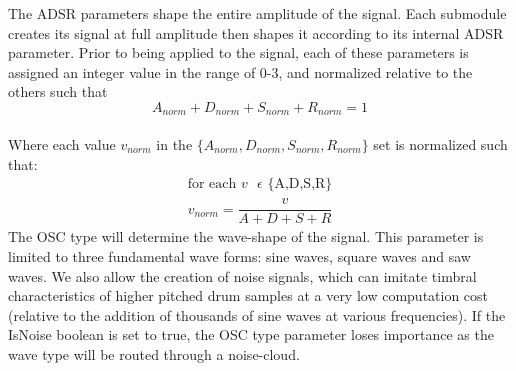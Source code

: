\documentclass[\main/thesis.tex]{subfiles}
\begin{document}
\begin{table}[t!]
\centering
{}
\caption{Synthesizer submodule Parameters. Despite the simplicity of the parameters and efforts at constraining the ranges, the number of parameters that can be randomly chosen for each submodule is in the order of $10^{15}$ }
\label{table:submodule_params}
\end{table}
The ADSR parameters shape the entire amplitude of the signal. Each submodule creates its signal at full amplitude then shapes it according to its internal ADSR parameter. Prior to being applied to the signal, each of these parameters is assigned an integer value in the range of 0-3, and normalized relative to the others such that \[ A_{norm} + D_{norm} + S_{norm} + R_{norm} = 1 \] \\ 
Where each value $v_{norm}$ in the $\{A_{norm}, D_{norm},S_{norm},R_{norm}\} $ set is normalized such that:
\begin{align*}
\text{for each $v$ $\epsilon$ \{A,D,S,R\}} \\
v_{norm} = \dfrac{v}{A + D + S + R}
\end{align*}
 The OSC type will determine the wave-shape of the signal. This parameter is limited to three fundamental wave forms: sine waves, square waves and saw waves. We also allow the creation of noise signals, which can imitate timbral characteristics of higher pitched drum samples at a very low computation cost (relative to the addition of thousands of sine waves at various frequencies). If the IsNoise boolean is set to true, the OSC type parameter loses importance as the wave type will be routed through a noise-cloud. 
\end{document}
